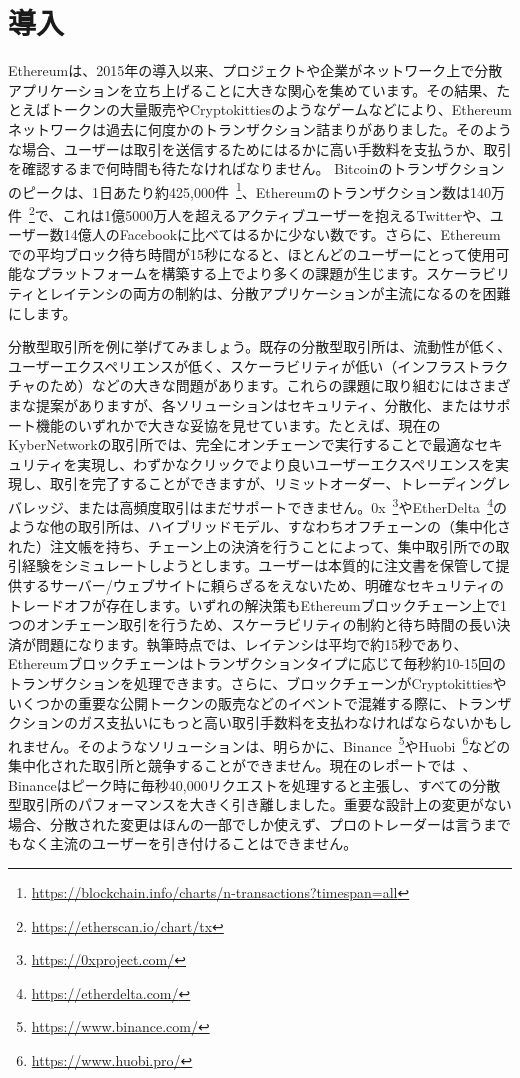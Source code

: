 \section{導入}
\label{sec:intro}

Ethereumは、2015年の導入以来、プロジェクトや企業がネットワーク上で分散アプリケーションを立ち上げることに大きな関心を集めています。その結果、たとえばトークンの大量販売やCryptokittiesのようなゲームなどにより、Ethereumネットワークは過去に何度かのトランザクション詰まりがありました。そのような場合、ユーザーは取引を送信するためにはるかに高い手数料を支払うか、取引を確認するまで何時間も待たなければなりません。 Bitcoinのトランザクションのピークは、1日あたり約425,000件~\footnote{\url{https://blockchain.info/charts/n-transactions?timespan=all}}、Ethereumのトランザクション数は140万件~\footnote{\url{https://etherscan.io/chart/tx}}で、これは1億5000万人を超えるアクティブユーザーを抱えるTwitterや、ユーザー数14億人のFacebookに比べてはるかに少ない数です。さらに、Ethereumでの平均ブロック待ち時間が15秒になると、ほとんどのユーザーにとって使用可能なプラットフォームを構築する上でより多くの課題が生じます。スケーラビリティとレイテンシの両方の制約は、分散アプリケーションが主流になるのを困難にします。

分散型取引所を例に挙げてみましょう。既存の分散型取引所は、流動性が低く、ユーザーエクスペリエンスが低く、スケーラビリティが低い（インフラストラクチャのため）などの大きな問題があります。これらの課題に取り組むにはさまざまな提案がありますが、各ソリューションはセキュリティ、分散化、またはサポート機能のいずれかで大きな妥協を見せています。たとえば、現在のKyberNetworkの取引所では、完全にオンチェーンで実行することで最適なセキュリティを実現し、わずかなクリックでより良いユーザーエクスペリエンスを実現し、取引を完了することができますが、リミットオーダー、トレーディングレバレッジ、または高頻度取引はまだサポートできません。0x~\footnote{\url{https://0xproject.com/}}やEtherDelta~\footnote{\url{https://etherdelta.com/}}のような他の取引所は、ハイブリッドモデル、すなわちオフチェーンの（集中化された）注文帳を持ち、チェーン上の決済を行うことによって、集中取引所での取引経験をシミュレートしようとします。ユーザーは本質的に注文書を保管して提供するサーバー/ウェブサイトに頼らざるをえないため、明確なセキュリティのトレードオフが存在します。いずれの解決策もEthereumブロックチェーン上で1つのオンチェーン取引を行うため、スケーラビリティの制約と待ち時間の長い決済が問題になります。執筆時点では、レイテンシは平均で約15秒であり、Ethereumブロックチェーンはトランザクションタイプに応じて毎秒約10-15回のトランザクションを処理できます。さらに、ブロックチェーンがCryptokittiesやいくつかの重要な公開トークンの販売などのイベントで混雑する際に、トランザクションのガス支払いにもっと高い取引手数料を支払わなければならないかもしれません。そのようなソリューションは、明らかに、Binance~\footnote{\url{https://www.binance.com/}}やHuobi~\footnote{\url{https://www.huobi.pro/}}などの集中化された取引所と競争することができません。現在のレポートでは~\cite{binance-report}、Binanceはピーク時に毎秒40,000リクエストを処理すると主張し、すべての分散型取引所のパフォーマンスを大きく引き離しました。重要な設計上の変更がない場合、分散された変更はほんの一部でしか使えず、プロのトレーダーは言うまでもなく主流のユーザーを引き付けることはできません。

